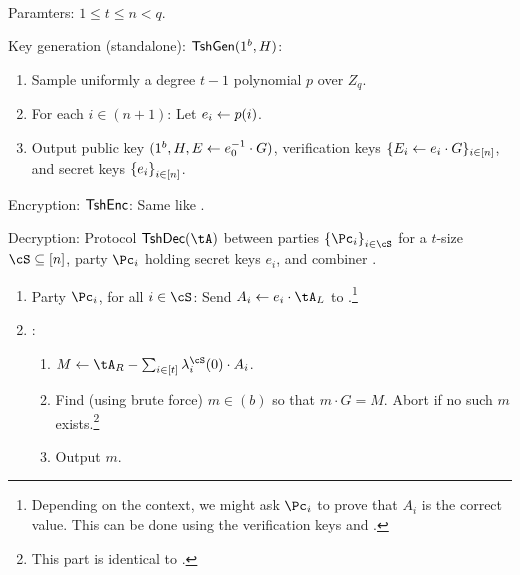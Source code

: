 \begin{algorithm}\label{alg:Tsh}~
	
	\item[Paramters:] $1\le t\le n <q$.
	
	
	\item[Key generation (standalone):] $\mathsf{TshGen}(1^b,H)$:
	\begin{enumerate}
		\item Sample   uniformly a degree $t-1$ polynomial  $p$ over $Z_q$. 
		
		\item For each $i\in (n+1)$: Let $e_i \leftarrow p(i)$.
		
		 
		
		 \item Output public key $(1^b,H,E \leftarrow e_0^{-1} \cdot G)$, verification keys $\{E_i \leftarrow e_i  \cdot G\}_{i\in [n]}$, and secret keys $\set{e_i}_{i\in [n]}$.
	\end{enumerate}
	

	
	\item[Encryption:]  $\mathsf{TshEnc}$:  Same like \EgEnc.
	
	
	
	\item[Decryption:] Protocol $\tdDec(\tA)$ between parties  $\set{\Pc_i}_{i\in \cS}$ for a $t$-size $\cS \subseteq [n]$, party $\Pc_i$ holding secret keys $e_i$, and combiner \Cc.
	
	\begin{enumerate}
		\item Party $\Pc_i$, for all $i\in \cS$:  Send   $A_i \asn e_i \cdot \tA_L$ to \Cc.\footnote{Depending on the context, we might ask $\Pc_i$ to prove that $A_i$ is  the correct value. This can be  done using  the verification keys and  \piZKPOK{\rEgConsSk}.}
		
		
		\item  \Cc: 
		\begin{enumerate}
			\item $M \asn \tA_R - \sum_{i\in [t]}   \lambda_i^\cS(0) \cdot A_i$.
			
			\item Find (using brute force) $m\in(b)$ so that $m\cdot G = M$. Abort if no such $m$ exists.\footnote{This part is identical to \EgDec.}
			
			\item Output $m$.
		\end{enumerate}
	\end{enumerate}
\end{algorithm}	

